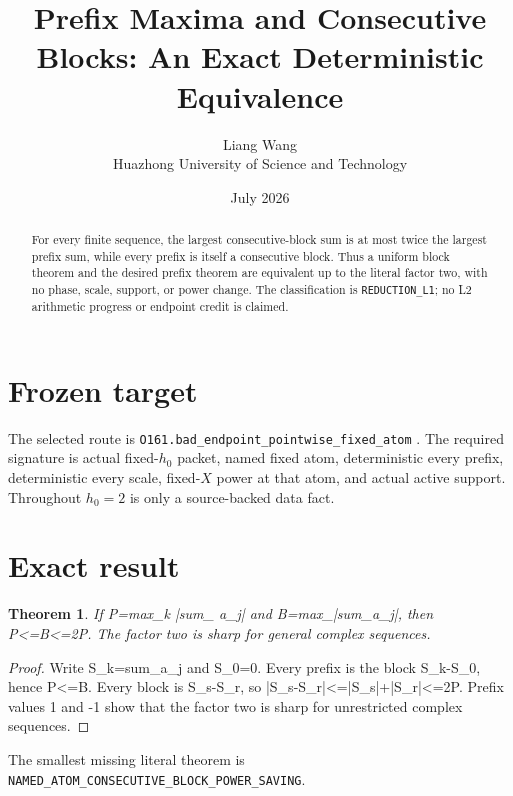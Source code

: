 \documentclass[11pt]{article}
\title{\textbf{Prefix Maxima and Consecutive Blocks: An Exact Deterministic Equivalence}}
\author{Liang Wang\\Huazhong University of Science and Technology}
\date{July 2026}
\newtheorem{theorem}{Theorem}
\begin{document}
\maketitle
\begin{abstract}
For every finite sequence, the largest consecutive-block sum is at most twice the largest prefix sum, while every prefix is itself a consecutive block.  Thus a uniform block theorem and the desired prefix theorem are equivalent up to the literal factor two, with no phase, scale, support, or power change.
The classification is \texttt{REDUCTION\_\allowbreak{}L1}; no L2 arithmetic
progress or endpoint credit is claimed.
\end{abstract}

\section{Frozen target}
The selected route is \texttt{O161.bad\_\allowbreak{}endpoint\_\allowbreak{}pointwise\_\allowbreak{}fixed\_\allowbreak{}atom} \citep{TPC182}.  The required
signature is actual fixed-$h_0$ packet, named fixed atom, deterministic every
prefix, deterministic every scale, fixed-$X$ power at that atom, and actual
active support.  Throughout $h_0=2$ is only a source-backed data fact.

\section{Exact result}
\begin{theorem}
If P=max\_\allowbreak{}k |sum\_ a\_\allowbreak{}j| and B=max\_|sum\_a\_\allowbreak{}j|, then P<=B<=2P.  The factor two is sharp for general complex sequences.
\end{theorem}
\begin{proof}
Write S\_\allowbreak{}k=sum\_a\_\allowbreak{}j and S\_\allowbreak{}0=0.  Every prefix is the block S\_\allowbreak{}k-S\_\allowbreak{}0, hence P<=B.  Every block is S\_\allowbreak{}s-S\_\allowbreak{}r, so |S\_\allowbreak{}s-S\_\allowbreak{}r|<=|S\_\allowbreak{}s|+|S\_\allowbreak{}r|<=2P.  Prefix values 1 and -1 show that the factor two is sharp for unrestricted complex sequences.
\end{proof}

The smallest missing literal theorem is
\texttt{NAMED\_\allowbreak{}ATOM\_\allowbreak{}CONSECUTIVE\_\allowbreak{}BLOCK\_\allowbreak{}POWER\_\allowbreak{}SAVING}.
\end{document}
